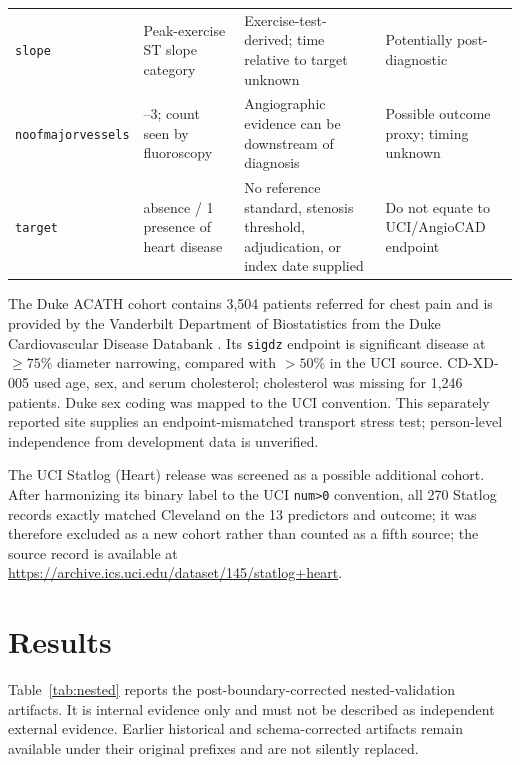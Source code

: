 \documentclass[journal]{IEEEtran}
\begin{document}
\begin{table}[t]
\begin{tabular}{@{}>{\raggedright\arraybackslash}p{2.0cm}>{\raggedright\arraybackslash}p{4.8cm}>{\raggedright\arraybackslash}p{6.1cm}>{\raggedright\arraybackslash}p{2.9cm}@{}}
\texttt{slope} & Peak-exercise ST slope category & Exercise-test-derived; time relative to target unknown & Potentially post-diagnostic \\
\texttt{noof\allowbreak major\allowbreak vessels} & 0--3; count seen by fluoroscopy & Angiographic evidence can be downstream of diagnosis & Possible outcome proxy; timing unknown \\
\texttt{target} & 0 absence / 1 presence of heart disease & No reference standard, stenosis threshold, adjudication, or index date supplied & Do not equate to UCI/AngioCAD endpoint \\
\bottomrule
\end{tabular}
\end{table}

The Duke ACATH cohort contains 3,504 patients referred for chest pain and is
provided by the Vanderbilt Department of Biostatistics from the Duke
Cardiovascular Disease Databank \cite{dukeacath2026}. Its \texttt{sigdz}
endpoint is significant disease at \(\geq 75\%\) diameter narrowing, compared
with \(>50\%\) in the UCI source. CD-XD-005 used age, sex, and serum
cholesterol; cholesterol was missing for 1,246 patients. Duke sex coding was
mapped to the UCI convention. This separately reported site supplies an
endpoint-mismatched transport stress test; person-level independence from
development data is unverified.

The UCI Statlog (Heart) release was screened as a possible additional cohort.
After harmonizing its binary label to the UCI \texttt{num>0} convention, all 270
Statlog records exactly matched Cleveland on the 13 predictors and outcome;
it was therefore excluded as a new cohort rather than counted as a fifth
source; the source record is available at
\url{https://archive.ics.uci.edu/dataset/145/statlog+heart}.

\section{Results}
Table~\ref{tab:nested} reports the post-boundary-corrected nested-validation
artifacts. It is internal evidence only and must not be described as
independent external evidence. Earlier historical and schema-corrected
artifacts remain available under their original prefixes and are not silently
replaced.

\begin{table}[t]
\centering
\caption{Nested internal validation summary.}
\label{tab:nested}

\end{table}
\end{document}
